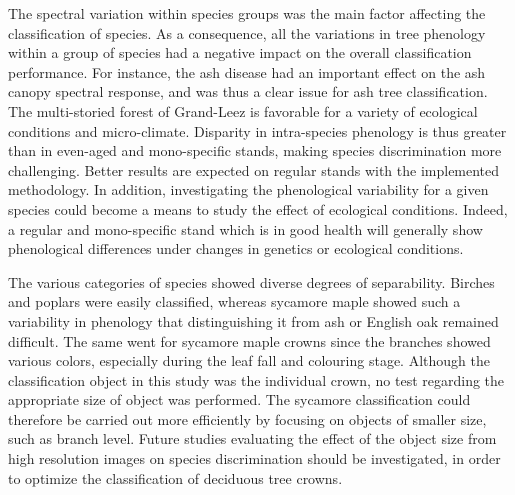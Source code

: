 \documentclass[remotesensing,article,submit,moreauthors,pdftex,12pt,a4paper]{mdpi} %
\begin{document}
The spectral variation within species groups was the main factor affecting the classification of species. As a consequence, all the variations in tree phenology within a group of species had a negative impact on the overall classification performance. For instance, the ash disease had an important effect on the ash canopy spectral response, and was thus a clear issue for ash tree classification. The multi-storied forest of Grand-Leez is favorable for a variety of ecological conditions and micro-climate. Disparity in intra-species phenology is thus greater than in even-aged and mono-specific stands, making species discrimination more challenging. Better results are expected on regular stands with the implemented methodology. In addition, investigating the phenological variability for a given species could become a means to study the effect of ecological conditions. Indeed, a regular and mono-specific stand which is in good health will generally show phenological differences under changes in genetics or ecological conditions.

The various categories of species showed diverse degrees of separability. Birches and poplars were easily classified, whereas sycamore maple showed such a variability in phenology that distinguishing it from ash or English oak remained difficult. The same went for sycamore maple crowns since the branches showed various colors, especially during the leaf fall and colouring stage. Although the classification object in this study was the individual crown, no test regarding the appropriate size of object was performed. The sycamore classification could therefore be carried out more efficiently by focusing on objects of smaller size, such as branch level. Future studies evaluating the effect of the object size from high resolution images on species discrimination should be investigated, in order to optimize the classification of deciduous tree crowns.




\end{document}
